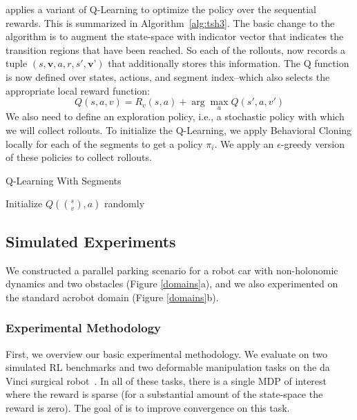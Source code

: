 \hirl applies a variant of Q-Learning to optimize the policy over the sequential rewards. This is summarized in Algorithm~\ref{alg:tsh3}. The basic change to the algorithm is to augment the state-space with indicator vector that indicates the transition regions that have been reached. So each of the rollouts, now records a tuple $(s,\textbf{v},a,r, s', \textbf{v'})$ that additionally stores this information. The Q function is now defined over states, actions, and segment index--which also selects the appropriate local reward function:
\[
Q(s,a,v) = R_v(s,a) + \arg \max_{a} Q(s',a, v')
\]
We also need to define an exploration policy, i.e., a stochastic policy with which we will collect rollouts. To initialize the Q-Learning, we apply Behavioral Cloning locally for each of the segments to get a policy $\pi_i$. We apply an $\epsilon$-greedy version of these policies to collect rollouts.

\begin{algorithmic}[t]
\small
\DontPrintSemicolon
\caption{Q-Learning With Segments \label{alg:tsh3}}

Initialize $Q(\binom{s}{v},a)$ randomly


\end{algorithmic}

\subsection{Simulated Experiments}
We constructed a parallel parking scenario for a robot car with non-holonomic dynamics and two obstacles (Figure \ref{domains}a), and we also experimented on the standard acrobot domain (Figure \ref{domains}b).

\subsubsection{Experimental Methodology}
First, we overview our basic experimental methodology. We evaluate \hirl on two simulated RL benchmarks and two deformable manipulation tasks on the da Vinci surgical robot~\cite{kazanzides2014open}. In all of these tasks, there is a single MDP of interest where the  reward is sparse (for a substantial amount of the state-space the reward is zero). The goal of \hirl is to improve convergence on this task.

